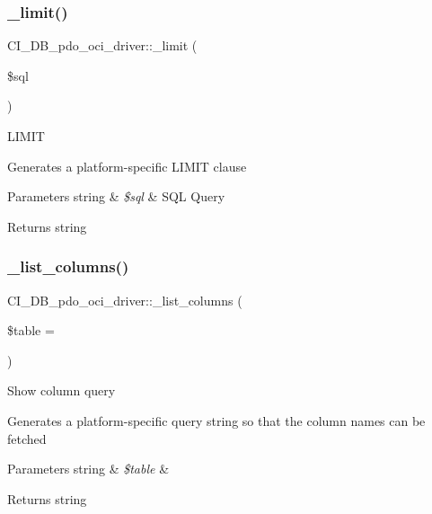 \subsubsection{\texorpdfstring{\+\_\+limit()}{\_limit()}}
{\footnotesize\ttfamily C\+I\+\_\+\+D\+B\+\_\+pdo\+\_\+oci\+\_\+driver\+::\+\_\+limit (\begin{DoxyParamCaption}\item[{}]{\$sql }\end{DoxyParamCaption})\hspace{0.3cm}{\ttfamily [protected]}}

L\+I\+M\+IT

Generates a platform-\/specific L\+I\+M\+IT clause


\begin{DoxyParams}[1]{Parameters}
string & {\em \$sql} & S\+QL Query \\
\hline
\end{DoxyParams}
\begin{DoxyReturn}{Returns}
string 
\end{DoxyReturn}
\mbox{\label{class_c_i___d_b__pdo__oci__driver_a872ef28aca2ad2cbc7ce9d0dbbf6c122}} 
\subsubsection{\texorpdfstring{\+\_\+list\+\_\+columns()}{\_list\_columns()}}
{\footnotesize\ttfamily C\+I\+\_\+\+D\+B\+\_\+pdo\+\_\+oci\+\_\+driver\+::\+\_\+list\+\_\+columns (\begin{DoxyParamCaption}\item[{}]{\$table = {\ttfamily \textquotesingle{}\textquotesingle{}} }\end{DoxyParamCaption})\hspace{0.3cm}{\ttfamily [protected]}}

Show column query

Generates a platform-\/specific query string so that the column names can be fetched


\begin{DoxyParams}[1]{Parameters}
string & {\em \$table} & \\
\hline
\end{DoxyParams}
\begin{DoxyReturn}{Returns}
string 
\end{DoxyReturn}
\mbox{\label{class_c_i___d_b__pdo__oci__driver_a1bb17d676f7b39f561e9f5cbe4c5952a}} 
